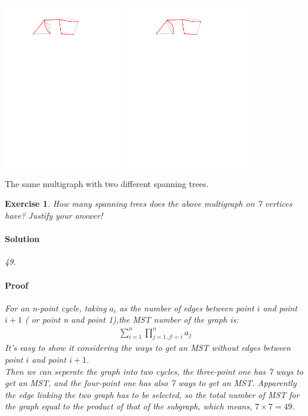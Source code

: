 \documentclass[12pt,a4]{article}
\newtheorem{exercise}[theorem]{Exercise}
\begin{document}
\begin{center}
  \includegraphics[width=0.4\textwidth]{figures/multigraph-forest.pdf} \hspace{2cm}
  \includegraphics[width=0.4\textwidth]{figures/multigraph-forest-other.pdf} \\
  The same multigraph with two different spanning trees.
\end{center}


\begin{exercise}
  How many spanning trees does the above multigraph on 7 vertices have?
  Justify your answer!\\
  \paragraph{Solution}
  49.
  \paragraph{Proof} For an n-point cycle, taking $a_i$ as the number of edges between point $i$ and point $i+1$ ( or point n and point 1),the MST number of the graph is:
  \begin{align*}
    \sum_{i=1}^{n}\prod_{j=1,j!=i}^{n}a_j
  \end{align*}
  It's easy to show it considering the ways to get an MST without edges between point $i$ and point $i+1$.\\
  Then we can seperate the graph into two cycles, the three-point one has 7 ways to get an MST, and the four-point one has also 7 ways to get an MST. Apparently the edge linking the two graph has to be selected, so the total number of MST for the graph equal to the product of that of the subgraph, which means, $7\times7 = 49$.
\end{exercise}
\end{document}
